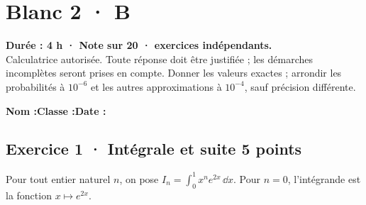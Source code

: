 \fi

\fi

\ifmxteacher

\mxnewpage{}\label{sujet:8-4}

\section*{Blanc 2 · B}


\textbf{Durée : 4 h · Note sur 20 ·  exercices indépendants.}\\Calculatrice autorisée. Toute réponse doit être justifiée ; les démarches incomplètes seront prises en compte. Donner les valeurs exactes ; arrondir les probabilités à $10^{-6}$ et les autres approximations à $10^{-4}$, sauf précision différente.

\smallskip\textbf{Nom :}\enspace\dotfill\quad\textbf{Classe :}\enspace\dotfill\quad\textbf{Date :}\enspace\dotfill

\subsection*{Exercice 1 · Intégrale et suite \hfill 5 points}Pour tout entier naturel $n$, on pose $I_n=\displaystyle\int_0^1x^ne^{2x}\,\dd x$. Pour $n=0$, l'intégrande est la fonction $x\mapsto e^{2x}$.

